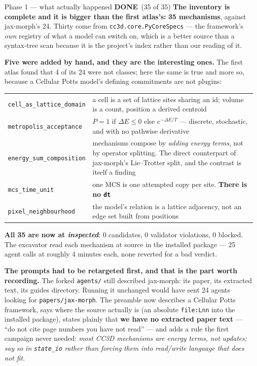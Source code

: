\documentclass[11pt,a4paper]{article}
\newcommand{\code}[1]{\texttt{#1}}
\newcommand{\done}{\textcolor{good}{\textbf{DONE}}}
\begin{document}
\begin{phasebox}{Phase 1 --- what actually happened \hfill \done\ (35 of 35)}
\textbf{The inventory is complete and it is bigger than the first atlas's:} \textbf{35
mechanisms}, against jax-morph's 24. Thirty come from \code{cc3d.core.PyCoreSpecs} --- the
framework's \emph{own} registry of what a model can switch on, which is a better source than a
syntax-tree scan because it is the project's index rather than our reading of it.

\textbf{Five were added by hand, and they are the interesting ones.} The first atlas found that 4
of its 24 were not classes; here the same is true and more so, because a Cellular Potts model's
defining commitments are not plugins:

\begin{center}
\footnotesize
\begin{tabular}{@{}l p{9.3cm}@{}}
\toprule
\code{cell\_as\_lattice\_domain} & a cell is a set of lattice sites sharing an id; volume is a
count, position a derived centroid\\
\code{metropolis\_acceptance} & $P = 1$ if $\Delta E \le 0$ else $e^{-\Delta E/T}$ --- discrete,
stochastic, and with no pathwise derivative\\
\code{energy\_sum\_composition} & mechanisms compose by \emph{adding energy terms}, not by
operator splitting. The direct counterpart of jax-morph's Lie--Trotter split, and the contrast is
itself a finding\\
\code{mcs\_time\_unit} & one MCS is one attempted copy per site. \textbf{There is no \code{dt}}\\
\code{pixel\_neighbourhood} & the model's relation is a lattice adjacency, not an edge set built
from positions\\
\bottomrule
\end{tabular}
\end{center}

\textbf{All 35 are now at \emph{inspected}}: 0 candidates, 0 validator violations, 0 blocked. The
excavator read each mechanism at source in the installed package --- 25 agent calls at roughly 4
minutes each, none reverted for a bad verdict.

\textbf{The prompts had to be retargeted first, and that is the part worth recording.} The forked
\code{agents/} still described jax-morph: its paper, its extracted text, its guides directory.
Running it unchanged would have sent 24 agents looking for \code{papers/jax-morph}. The preamble
now describes a Cellular Potts framework, says where the source actually is (an absolute
\code{file:Lnn} into the installed package), states plainly that \textbf{we have no extracted
paper text} --- ``do not cite page numbers you have not read'' --- and adds a rule the first
campaign never needed: \emph{most CC3D mechanisms are energy terms, not updates; say so in
\code{state\_io} rather than forcing them into read/write language that does not fit.}


\end{phasebox}
\end{document}
